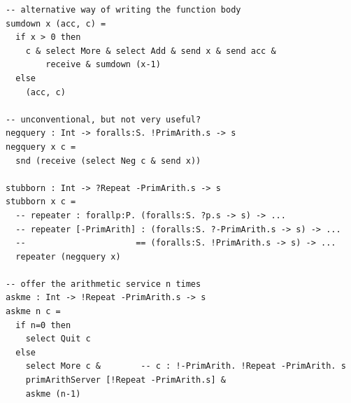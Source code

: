 \begin{lstlisting}
-- alternative way of writing the function body
sumdown x (acc, c) = 
  if x > 0 then
    c & select More & select Add & send x & send acc &
        receive & sumdown (x-1)
  else
    (acc, c)

-- unconventional, but not very useful?
negquery : Int -> foralls:S. !PrimArith.s -> s
negquery x c = 
  snd (receive (select Neg c & send x))

stubborn : Int -> ?Repeat -PrimArith.s -> s
stubborn x c =
  -- repeater : forallp:P. (foralls:S. ?p.s -> s) -> ...
  -- repeater [-PrimArith] : (foralls:S. ?-PrimArith.s -> s) -> ...
  --                      == (foralls:S. !PrimArith.s -> s) -> ...
  repeater (negquery x)

-- offer the arithmetic service n times
askme : Int -> !Repeat -PrimArith.s -> s
askme n c =
  if n=0 then
    select Quit c
  else
    select More c &        -- c : !-PrimArith. !Repeat -PrimArith. s
    primArithServer [!Repeat -PrimArith.s] & 
    askme (n-1)
\end{lstlisting}

\clearpage



